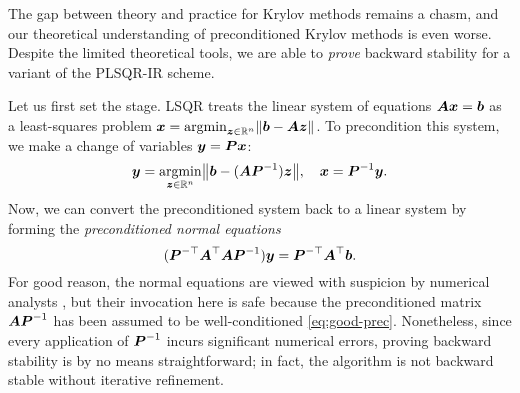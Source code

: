 \documentclass[onefignum,onetabnum,pagebackref,dvipsnames]{siamart220329}
\begin{document}
The gap between theory and practice for Krylov methods remains a chasm, and our theoretical understanding of preconditioned Krylov methods is even worse.
Despite the limited theoretical tools, we are able to \emph{prove} backward stability for a variant of the PLSQR-IR scheme.

Let us first set the stage.
LSQR treats the linear system of equations $\boldsymbol{A}\boldsymbol{x} = \boldsymbol{b}$ as a least-squares problem $\vec{x} = \argmin_{\vec{z} \in \real^n} \norm{\vec{b} - \mat{A}\vec{z}}$.
To precondition this system, we make a change of variables $\boldsymbol{y} = \boldsymbol{P}\boldsymbol{x}$: 
%
\begin{equation} \label{eq:pre-ls}
    \vec{y} = \argmin_{\vec{z}\in\real^n} \norm{\vec{b} - (\mat{A}\mat{P}^{-1})\vec{z}}, \quad \vec{x} = \mat{P}^{-1}\vec{y}.
\end{equation}
%
Now, we can convert the preconditioned system back to a linear system by forming the \emph{preconditioned normal equations}
%
\begin{equation} \label{eq:pre-normal}
    (\boldsymbol{P}^{-\top}\boldsymbol{A}^\top\boldsymbol{A}\boldsymbol{P}^{-1})\boldsymbol{y} = \boldsymbol{P}^{-\top}\boldsymbol{A}^\top\boldsymbol{b}.
\end{equation}
%
For good reason, the normal equations are viewed with suspicion by numerical analysts \cite{Hig22}, but their invocation here is safe because the preconditioned matrix $\boldsymbol{A}\boldsymbol{P}^{-1}$ has been assumed to be well-conditioned \cref{eq:good-prec}. Nonetheless, since every application of $\boldsymbol{P}^{-1}$ incurs significant numerical errors, proving backward stability is by no means straightforward; in fact, the algorithm is not backward stable without iterative refinement.
\end{document}
